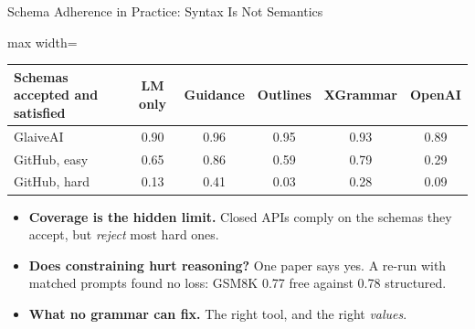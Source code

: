\begin{frame}{Schema Adherence in Practice: Syntax Is Not Semantics}
    \begin{center}
    \small
    \renewcommand{\arraystretch}{1.15}
    \begin{adjustbox}{max width=\linewidth}\begin{tabular}{lccccc}
        \toprule
        \textbf{Schemas accepted and satisfied} & \textbf{LM only} & \textbf{Guidance} & \textbf{Outlines} & \textbf{XGrammar} & \textbf{OpenAI} \\
        \midrule
        GlaiveAI & 0.90 & 0.96 & 0.95 & 0.93 & 0.89 \\
        GitHub, easy & 0.65 & 0.86 & 0.59 & 0.79 & 0.29 \\
        GitHub, hard & 0.13 & 0.41 & 0.03 & 0.28 & \alert{0.09} \\
        \bottomrule
    \end{tabular}\end{adjustbox}
    \end{center}
    \begin{itemize}\itemsep0.4em
        \item \textbf{Coverage is the hidden limit.} Closed APIs comply on the schemas they accept, but \emph{reject} most hard ones.
        \item \textbf{Does constraining hurt reasoning?} One paper says yes. A re-run with matched prompts found no loss: GSM8K 0.77 free against 0.78 structured.
        \item \textbf{What no grammar can fix.} The right tool, and the right \emph{values}.
    \end{itemize}
\end{frame}

